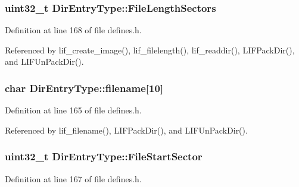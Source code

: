 \subsubsection[{\texorpdfstring{File\+Length\+Sectors}{FileLengthSectors}}]{\setlength{\rightskip}{0pt plus 5cm}uint32\+\_\+t Dir\+Entry\+Type\+::\+File\+Length\+Sectors}\hypertarget{structDirEntryType_a0ad3a6b6da198caa68e7e82d025975cb}{}\label{structDirEntryType_a0ad3a6b6da198caa68e7e82d025975cb}


Definition at line 168 of file defines.\+h.



Referenced by lif\+\_\+create\+\_\+image(), lif\+\_\+filelength(), lif\+\_\+readdir(), L\+I\+F\+Pack\+Dir(), and L\+I\+F\+Un\+Pack\+Dir().

\subsubsection[{\texorpdfstring{filename}{filename}}]{\setlength{\rightskip}{0pt plus 5cm}char Dir\+Entry\+Type\+::filename\mbox{[}10\mbox{]}}\hypertarget{structDirEntryType_aa60fae0a6b7ba9c966cbcf46e555f396}{}\label{structDirEntryType_aa60fae0a6b7ba9c966cbcf46e555f396}


Definition at line 165 of file defines.\+h.



Referenced by lif\+\_\+filename(), L\+I\+F\+Pack\+Dir(), and L\+I\+F\+Un\+Pack\+Dir().

\subsubsection[{\texorpdfstring{File\+Start\+Sector}{FileStartSector}}]{\setlength{\rightskip}{0pt plus 5cm}uint32\+\_\+t Dir\+Entry\+Type\+::\+File\+Start\+Sector}\hypertarget{structDirEntryType_a062849a9cc935042c7a3a28ed90ab6a1}{}\label{structDirEntryType_a062849a9cc935042c7a3a28ed90ab6a1}


Definition at line 167 of file defines.\+h.



